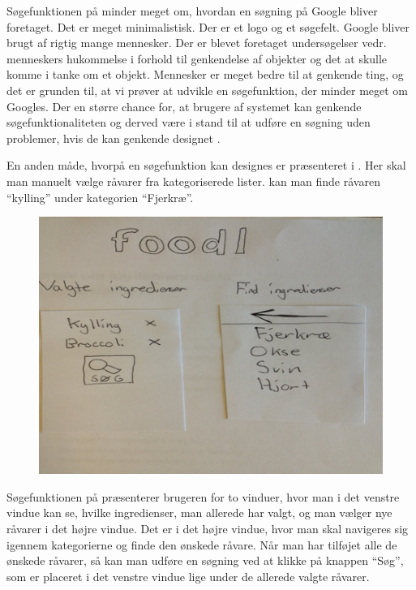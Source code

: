 Søgefunktionen på  minder meget om, hvordan en søgning på \fx Google bliver foretaget. Det er meget minimalistisk. Der er et logo og et søgefelt. Google bliver brugt af rigtig mange mennesker. Der er blevet foretaget undersøgelser vedr. menneskers hukommelse i forhold til genkendelse af objekter og det at skulle komme i tanke om et objekt. Mennesker er meget bedre til at genkende ting, og det er grunden til, at vi prøver at udvikle en søgefunktion, der minder meget om Googles. Der en større chance for, at brugere af systemet kan genkende søgefunktionaliteten og derved være i stand til at udføre en søgning uden problemer, hvis de kan genkende designet \cite[p. ~340]{deb}.

En anden måde, hvorpå en søgefunktion kan designes er præsenteret i . Her skal man manuelt vælge råvarer fra kategoriserede lister. \Fx kan man finde råvaren ``kylling'' under kategorien ``Fjerkræ''.

\begin{figure}[H]
	\centering
	\includegraphics[scale=0.7]{billeder/prototyper/prototype1b.png}
	\label{fig:prototype1bdesign}
\end{figure}

Søgefunktionen på  præsenterer brugeren for to vinduer, hvor man i det venstre vindue kan se, hvilke ingredienser, man allerede har valgt, og man vælger nye råvarer i det højre vindue. Det er i det højre vindue, hvor man skal navigeres sig igennem kategorierne og finde den ønskede råvare. Når man har tilføjet alle de ønskede råvarer, så kan man udføre en søgning ved at klikke på knappen ``Søg'', som er placeret i det venstre vindue lige under de allerede valgte råvarer.

